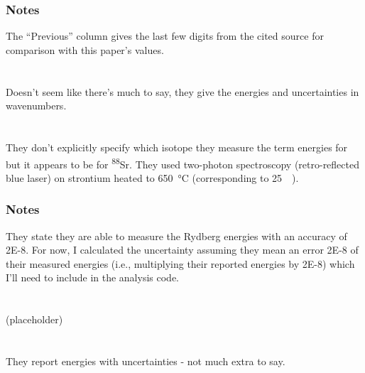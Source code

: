 \documentclass{article}
\newcommand{\tsup}{\textsuperscript}													%
\newcommand{\Sr}[1]{\tsup{#1}\textnormal{Sr}}											%
\begin{document}
\subsubsection{Notes}

The ``Previous'' column gives the last few digits from the cited source for comparison with this paper's values. 

\section{}

Doesn't seem like there's much to say, they give the energies and uncertainties in wavenumbers. 

\section{}

They don't explicitly specify which isotope they measure the term energies for but it appears to be for \Sr{88}. They used two-photon spectroscopy (retro-reflected blue laser) on strontium heated to \SI{650}{\celsius} (corresponding to \SI{25}{\milli\Torr}). 

\subsubsection{Notes}

They state they are able to measure the Rydberg energies with an accuracy of \num{2E-8}. For now, I calculated the uncertainty assuming they mean an error \num{2E-8} of their measured energies (i.e., multiplying their reported energies by \num{2E-8}) which I'll need to include in the analysis code. 

\section*{}

(placeholder)

\section{}

They report energies with uncertainties - not much extra to say.

\section{}
\end{document}
